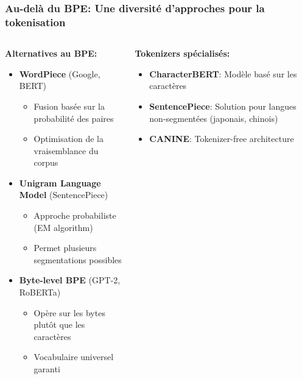 \documentclass[aspectratio=169,11pt]{beamer}
\begin{document}
\begin{frame}
    \frametitle{Au-delà du BPE: Une diversité d'approches pour la tokenisation}
    
    \begin{columns}[T]
        \begin{column}{0.5\textwidth}
            \textbf{Alternatives au BPE:}
            \begin{itemize}
                \item \textbf{WordPiece} (Google, BERT)
                \begin{itemize}
                    \item Fusion basée sur la probabilité des paires
                    \item Optimisation de la vraisemblance du corpus
                \end{itemize}
                \vspace{0.2cm}
                \item \textbf{Unigram Language Model} (SentencePiece)
                \begin{itemize}
                    \item Approche probabiliste (EM algorithm)
                    \item Permet plusieurs segmentations possibles
                \end{itemize}
                \vspace{0.2cm}
                \item \textbf{Byte-level BPE} (GPT-2, RoBERTa)
                \begin{itemize}
                    \item Opère sur les bytes plutôt que les caractères
                    \item Vocabulaire universel garanti
                \end{itemize}
            \end{itemize}
        \end{column}
        
        \begin{column}{0.5\textwidth}
            \textbf{Tokenizers spécialisés:}
            \begin{itemize}
                \item \textbf{CharacterBERT}: Modèle basé sur les caractères
                \item \textbf{SentencePiece}: Solution pour langues non-segmentées (japonais, chinois)
                \item \textbf{CANINE}: Tokenizer-free architecture
            \end{itemize}
        \end{column}
    \end{columns}
\end{frame}
\end{document}
